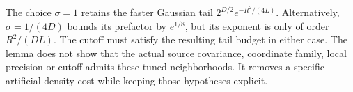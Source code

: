 \documentclass[11pt]{article}
\begin{document}
The choice $\sigma=1$ retains the faster Gaussian tail
$2^{D/2}e^{-R^2/(4L)}$. Alternatively,
$\sigma=1/(4D)$ bounds its prefactor by $e^{1/8}$,
but its exponent is only of order $R^2/(DL)$.
The cutoff must satisfy the resulting tail budget in either
case. The lemma does not show that the actual source
covariance, coordinate family, local precision or cutoff
admits these tuned neighborhoods. It removes a specific
artificial density cost while keeping those hypotheses
explicit.
\end{document}
